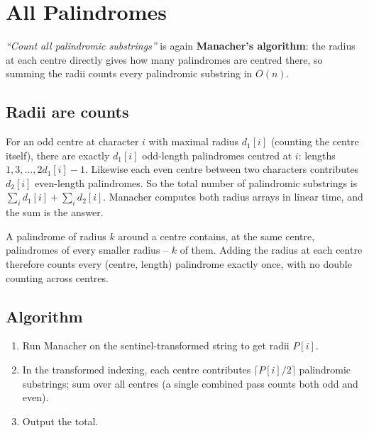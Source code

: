 \section{All Palindromes}
\label{sec:cses-all-palindromes}


\begin{patternbox}
\emph{``Count all palindromic substrings''} is again \textbf{Manacher's
algorithm}: the radius at each centre directly gives how many palindromes
are centred there, so summing the radii counts every palindromic substring
in $O(n)$.
\end{patternbox}

\subsection*{Radii are counts}

For an odd centre at character $i$ with maximal radius $d_1[i]$ (counting
the centre itself), there are exactly $d_1[i]$ odd-length palindromes
centred at $i$: lengths $1,3,\ldots,2d_1[i]-1$. Likewise each even centre
between two characters contributes $d_2[i]$ even-length palindromes. So
the total number of palindromic substrings is
$\sum_i d_1[i]+\sum_i d_2[i]$. Manacher computes both radius arrays in
linear time, and the sum is the answer.

\begin{ideabox}
A palindrome of radius $k$ around a centre contains, at the same centre,
palindromes of every smaller radius -- $k$ of them. Adding the radius at
each centre therefore counts every (centre, length) palindrome exactly
once, with no double counting across centres.
\end{ideabox}

\subsection*{Algorithm}

\begin{enumerate}
  \item Run Manacher on the sentinel-transformed string to get radii
        $P[i]$.
  \item In the transformed indexing, each centre contributes
        $\lceil P[i]/2\rceil$ palindromic substrings; sum over all
        centres (a single combined pass counts both odd and even).
  \item Output the total.
\end{enumerate}

